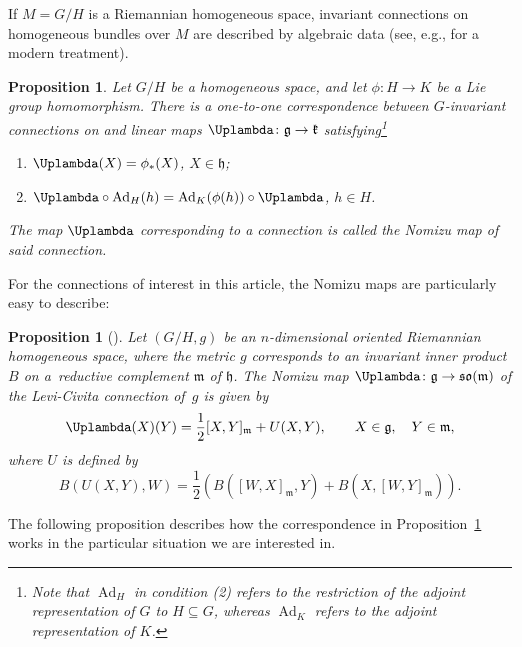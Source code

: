 \documentclass[pdftex]{sigma}
\numberwithin{equation}{section}
\newtheorem{Proposition}[Theorem]{Proposition}
{ \theoremstyle{definition}
	\newtheorem{Definition}[Theorem]{Definition}
	\newtheorem{Note}[Theorem]{Note}
	\newtheorem{Example}[Theorem]{Example}
	\newtheorem{Remark}[Theorem]{Remark} }
\DeclareMathOperator{\Ad}{Ad}
\begin{document}
		If $M=G/H$ is a Riemannian homogeneous space, invariant connections on homogeneous bundles over $M$ are described by algebraic data \cite{nomizu} (see, e.g., \cite{ANT} for a modern treatment).

		\begin{Proposition}\label{prelims:Nomizu_characterization}
			Let $G/H$ be a homogeneous space, and let $\phi \colon H \to K$ be a Lie group homomorphism. There is a one-to-one correspondence between $G$-invariant connections on  and linear maps $\Uplambda\colon \mathfrak{g}\to \mathfrak{k}$ satisfying\footnote{Note that $\Ad_H$ in condition (2) refers to the restriction of the adjoint representation of $G$ to $H\subseteq G$, whereas $\Ad_K$ refers to the adjoint representation of $K$.}
			\begin{enumerate}\itemsep=0pt
				\item[$(1)$] $\Uplambda(X) = \phi_* (X)$, $X \in \mathfrak{h}$;
				\item[$(2)$] $\Uplambda \circ \Ad_H(h) = \Ad_K(\phi(h) ) \circ \Uplambda$, $ h \in H$.
			\end{enumerate}
			The map $\Uplambda$ corresponding to a connection is called the \textit{Nomizu map} of said connection.
		\end{Proposition}
		
		For the connections of interest in this article, the Nomizu maps are particularly easy to describe:
		
		\begin{Proposition}[{\cite[Theorem~13.1]{nomizu}}]
			Let $(G/H,g)$ be an $n$-dimensional oriented Riemannian homogeneous space, where the metric $g$ corresponds to an invariant inner product $B$ on a~reductive complement $\mathfrak{m}$ of $\mathfrak{h}$. The Nomizu map $\Uplambda \colon \mathfrak{g} \to \mathfrak{so}(\mathfrak{m})$ of the Levi-Civita connection of~$g$ is given by
			\[
			\Uplambda(X)(Y) = \frac{1}{2} [ X,Y ]_{\mathfrak{m}} + U(X,Y) , \qquad X \in \mathfrak{g} , \quad Y \in \mathfrak{m} ,
			\]
			where $U$ is defined by
			\[
			B ( U(X,Y) , W ) = \frac{1}{2} ( B ( [W,X]_{\mathfrak{m}} , Y ) + B ( X , [W,Y]_{\mathfrak{m}} ) ) .
			\]
		\end{Proposition}

		The following proposition describes how the correspondence in Proposition~\ref{prelims:Nomizu_characterization} works in the particular situation we are interested in.
\end{document}
